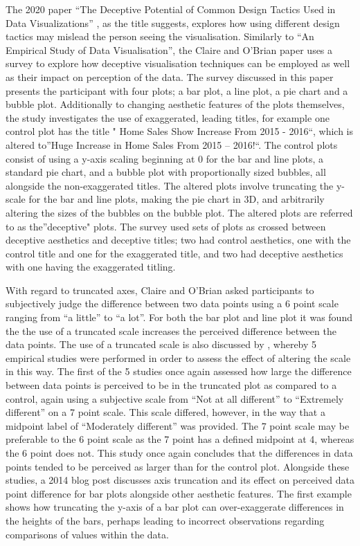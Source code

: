 \documentclass[
  12pt,
  twocolumn]{book}
\begin{document}
The 2020 paper ``The Deceptive Potential of Common Design Tactics Used
in Data Visualizations'' \citep{claire-obrian}, as the title suggests,
explores how using different design tactics may mislead the person
seeing the visualisation. Similarly to ``An Empirical Study of Data
Visualisation'', the Claire and O'Brian paper uses a survey to explore
how deceptive visualisation techniques can be employed as well as their
impact on perception of the data. The survey discussed in this paper
presents the participant with four plots; a bar plot, a line plot, a pie
chart and a bubble plot. Additionally to changing aesthetic features of
the plots themselves, the study investigates the use of exaggerated,
leading titles, for example one control plot has the title " Home Sales
Show Increase From 2015 - 2016``, which is altered to''Huge Increase in
Home Sales From 2015 -- 2016!``. The control plots consist of using a
y-axis scaling beginning at 0 for the bar and line plots, a standard pie
chart, and a bubble plot with proportionally sized bubbles, all
alongside the non-exaggerated titles. The altered plots involve
truncating the y-scale for the bar and line plots, making the pie chart
in 3D, and arbitrarily altering the sizes of the bubbles on the bubble
plot. The altered plots are referred to as the''deceptive" plots. The
survey used sets of plots as crossed between deceptive aesthetics and
deceptive titles; two had control aesthetics, one with the control title
and one for the exaggerated title, and two had deceptive aesthetics with
one having the exaggerated titling.

With regard to truncated axes, Claire and O'Brian asked participants to
subjectively judge the difference between two data points using a 6
point scale ranging from ``a little'' to ``a lot''. For both the bar
plot and line plot it was found the the use of a truncated scale
increases the perceived difference between the data points. The use of a
truncated scale is also discussed by \citet{YANG2021}, whereby 5
empirical studies were performed in order to assess the effect of
altering the scale in this way. The first of the 5 studies once again
assessed how large the difference between data points is perceived to be
in the truncated plot as compared to a control, again using a subjective
scale from ``Not at all different'' to ``Extremely different'' on a 7
point scale. This scale differed, however, in the way that a midpoint
label of ``Moderately different'' was provided. The 7 point scale may be
preferable to the 6 point scale as the 7 point has a defined midpoint at
4, whereas the 6 point does not. This study once again concludes that
the differences in data points tended to be perceived as larger than for
the control plot. Alongside these studies, a 2014 blog post
\citep{parikh_2014} discusses axis truncation and its effect on
perceived data point difference for bar plots alongside other aesthetic
features. The first example shows how truncating the y-axis of a bar
plot can over-exaggerate differences in the heights of the bars, perhaps
leading to incorrect observations regarding comparisons of values within
the data.
\end{document}
